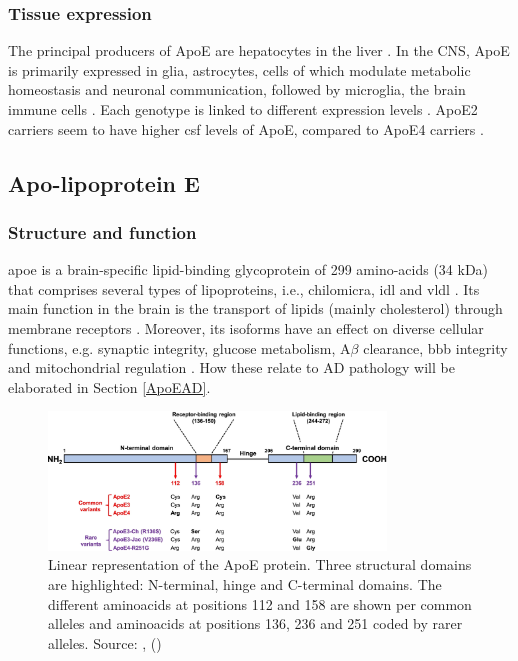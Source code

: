\documentclass{amsart}
\begin{document}
\subsubsection{Tissue expression}
The principal producers of ApoE are hepatocytes in the liver \cite{Mahley2016CentralMetabolism}. In the CNS, ApoE is primarily expressed in glia, astrocytes, cells of which modulate metabolic homeostasis and neuronal communication, followed by microglia, the brain immune cells \cite{Lanfranco2021ExpressionInflammation}. Each genotype is linked to different expression levels \cite{Husain2021APOETherapeutics}. ApoE2 carriers seem to have higher \acrfull{csf} levels of ApoE, compared to ApoE4 carriers \cite{Castellano2011HumanClearance, Cruchaga2012CerebrospinalDisease}. 

\newpage
\subsection{Apo-lipoprotein E}\label{ApoEprot}
\subsubsection{Structure and function}
\acrshort{apoe} is a brain-specific lipid-binding glycoprotein of 299 amino-acids (34 kDa) that comprises several types of lipoproteins, i.e., chilomicra, \acrlong{idl} and \acrlong{vldl} \cite{Husain2021APOETherapeutics}. Its main function in the brain is the transport of lipids (mainly cholesterol) through membrane receptors \cite{Yang2023ApolipoproteinDisease}. Moreover, its isoforms have an effect on diverse cellular functions, e.g. synaptic integrity, glucose metabolism, A$\beta$ clearance, \acrlong{bbb} integrity and mitochondrial regulation \cite{Husain2021APOETherapeutics}. How these relate to AD pathology will be elaborated in Section \ref{ApoEAD}.



\begin{figure}[htb]
  \includegraphics[width=0.8\textwidth]{figures/ApoEprot.png}
    \caption{Linear representation of the ApoE protein. Three structural domains are highlighted: N-terminal, hinge and C-terminal domains. The different aminoacids at positions 112 and 158 are shown per common alleles and aminoacids at positions 136, 236 and 251 coded by rarer alleles. Source: ,  (\citeyear{Bu2022APOEVariants}) \cite{Bu2022APOEVariants}}
  \label{fig2}
\end{figure}
\end{document}

